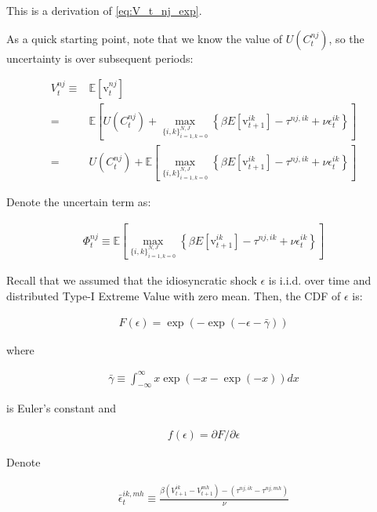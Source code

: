 \documentclass[10pt]{article}
\begin{document}
This is a derivation of \autoref{eq:V_t_nj_exp}.

As a quick starting point, note that we know the 
value of $U\left(C_t^{n j}\right)$, so 
the uncertainty is over subsequent periods:

\begin{align}
    V_t^{n j} \equiv &\mathbb{E}\left[\mathrm{v}_t^{n j}\right] \\
    = &\mathbb{E}\left[U\left(C_t^{n j}\right)+\max _{\{i, k\}_{i=1, k=0}^{N, J}}\left\{\beta E\left[\mathrm{v}_{t+1}^{i k}\right]-\tau^{n j, i k}+\nu \epsilon_t^{i k}\right\}\right] \\
    = &U\left(C_t^{n j}\right)+ \mathbb{E}\left[\max _{\{i, k\}_{i=1, k=0}^{N, J}}\left\{\beta E\left[\mathrm{v}_{t+1}^{i k}\right]-\tau^{n j, i k}+\nu \epsilon_t^{i k}\right\}\right]
\end{align}

Denote the uncertain term as:

\begin{align}
    \Phi_t^{n j} \equiv \mathbb{E}\left[\max _{\{i, k\}_{i=1, k=0}^{N, J}}\left\{\beta E\left[\mathrm{v}_{t+1}^{i k}\right]-\tau^{n j, i k}+\nu \epsilon_t^{i k}\right\}\right]
\end{align}

Recall that we assumed that the idiosyncratic shock $\epsilon$ is i.i.d. over time
and distributed Type-I Extreme Value with zero mean. Then, the 
CDF of $\epsilon$ is:

\begin{align}
    F(\epsilon)=\exp (-\exp (-\epsilon-\bar{\gamma}))
\end{align}

where 

\begin{align}
    \bar{\gamma} \equiv \int_{-\infty}^{\infty} x \exp (-x-\exp (-x)) d x
\end{align}

is Euler's constant and 

\begin{align}
    f(\epsilon)=\partial F / \partial \epsilon
\end{align}

Denote

\begin{align}
    \bar{\epsilon}_t^{i k, m h} \equiv \frac{\beta\left(V_{t+1}^{i k}-V_{t+1}^{m h}\right)-\left(\tau^{n j, i k}-\tau^{n j, m h}\right)}{\nu} \label{eq:bar_epsilon_exp}
\end{align}
\end{document}
